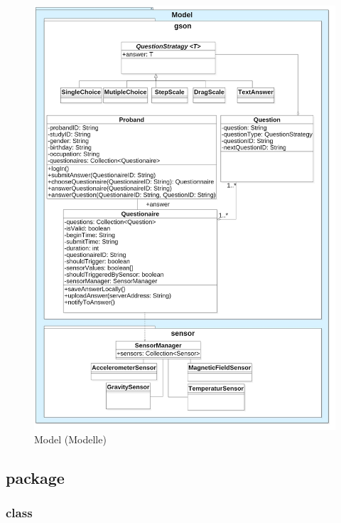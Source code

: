 \documentclass[a4paper]{scrreprt}
\begin{document}
{            \begin{figure}[H]
                \centering
                \includegraphics[scale=0.28]{Model.jpg}
                \caption{Model (Modelle)}
            \end{figure}


            \newpage
            \subsection{package }

                \vspace*{1cm}
                \subsubsection{class }


}
\end{document}
